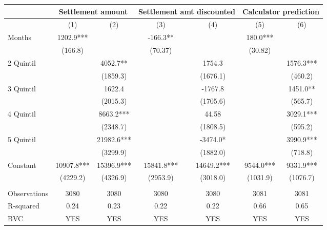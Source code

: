 \begin{tabular}{lcccccc}
\toprule
      & \multicolumn{2}{c}{Settlement amount} & \multicolumn{2}{c}{Settlement amt discounted} & \multicolumn{2}{c}{Calculator prediction} \\
\midrule
\midrule
      & (1)   & (2)   & (3)   & (4)   & (5)   & (6) \\
\midrule
\midrule
Months  & 1202.9*** &       & -166.3** &       & 180.0*** &  \\
      & (166.8) &       & (70.37) &       & (30.82) &  \\
2 Quintil &       & 4052.7** &       & 1754.3 &       & 1576.3*** \\
      &       & (1859.3) &       & (1676.1) &       & (460.2) \\
3 Quintil &       & 1622.4 &       & -1767.8 &       & 1451.0** \\
      &       & (2015.3) &       & (1705.6) &       & (565.7) \\
4 Quintil &       & 8663.2*** &       & 44.58 &       & 3029.1*** \\
      &       & (2348.7) &       & (1808.5) &       & (595.2) \\
5 Quintil &       & 21982.6*** &       & -3474.0* &       & 3990.9*** \\
      &       & (3299.9) &       & (1882.0) &       & (718.8) \\
Constant  & 10907.8*** & 15396.9*** & 15841.8*** & 14649.2*** & 9544.0*** & 9331.9*** \\
      & (4229.2) & (4326.9) & (2953.9) & (3018.0) & (1031.9) & (1076.7) \\
      &       &       &       &       &       &  \\
\midrule
Observations  & 3080  & 3080  & 3080  & 3080  & 3081  & 3081 \\
R-squared & 0.24  & 0.23  & 0.22  & 0.22  & 0.66  & 0.65 \\
BVC   & YES   & YES   & YES   & YES   & YES   & YES \\
\bottomrule
\bottomrule
\end{tabular}%

